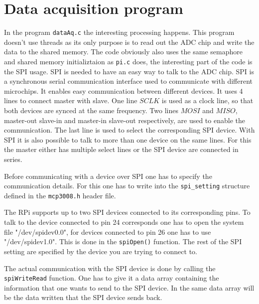 \documentclass[12pt,paper=a4,twoside]{scrartcl}
\numberwithin{equation}{section}
\begin{document}
\section{Data acquisition program}
In the program \verb+dataAq.c+ the interesting processing happens. This program doesn't use threads as its only purpose is to read out the ADC chip and write the data to the shared memory. The code obviously also uses the same semaphore and shared memory initializtaion as \verb+pi.c+ does, the interesting part of the code is the SPI usage. SPI is needed to have an easy way to talk to the ADC chip. SPI is a synchronous serial communication interface used to communicate with different microchips. It enables easy communication between different devices. It uses 4 lines to connect master with slave. One line $SCLK$ is used as a clock line, so that both devices are synced at the same frequency. Two lines $MOSI$ and $MISO$, master-out slave-in and master-in slave-out respectively, are used to enable the communication. The last line is used to select the corresponding SPI device. With SPI it is also possible to talk to more than one device on the same lines. For this the master either has multiple select lines or the SPI device are connected in series.

Before communicating with a device over SPI one has to specify the communication details.
For this one has to write into the \verb+spi_setting+ structure defined in the \verb+mcp3008.h+ header file.


The RPi supports up to two SPI devices connected to its corresponding pins. To talk to the device connected to pin 24 corresponds one has to open the system file "/dev/spidev0.0", for devices connected to pin 26 one has to use "/dev/spidev1.0". This is done in the \verb+spiOpen()+ function. The rest of the SPI setting are specified by the device you are trying to connect to.

The actual communication with the SPI device is done by calling the \verb+spiWriteRead+ function. One has to give it a data array containing the information that one wants to send to the SPI device. In the same data array will be the data written that the SPI device sends back.

\end{document}
